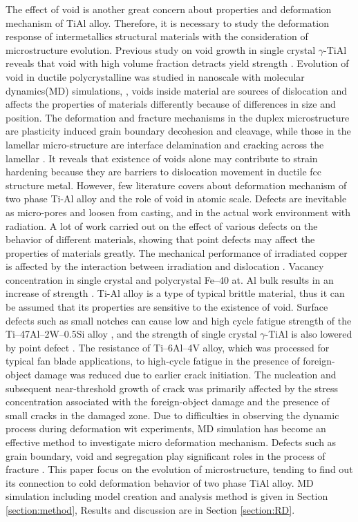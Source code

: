 \documentclass[materials,article,submit,moreauthors,pdftex,10pt,a4paper]{Definitions/mdpi}
\begin{document}
The effect of void is another great concern about properties and deformation mechanism  of TiAl alloy.  Therefore, it is necessary to study the deformation response of intermetallics structural materials with the consideration of microstructure evolution. Previous study on void growth in single crystal $\gamma$-TiAl reveals that void with high volume fraction detracts yield strength \cite{Tang2014, Xu2011}. Evolution of void in ductile polycrystalline was studied in nanoscale with molecular dynamics(MD) simulations, \cite{Jing2018a,Elkhateeb2018}, voids inside material are sources of dislocation and affects the properties of materials differently because of differences in size and position.  The deformation and fracture mechanisms in the duplex microstructure are plasticity induced grain boundary decohesion and cleavage, while those in the lamellar micro-structure are interface delamination and cracking across the lamellar \cite{Tang2014}. It reveals that existence of voids alone may contribute to strain hardening because they are barriers to dislocation movement in ductile fcc structure metal\cite{Xiong2015}. However, few literature covers about deformation mechanism of two phase Ti-Al alloy and the role of void in atomic scale. Defects are inevitable as micro-pores and loosen from casting, and in the actual work environment with radiation. A lot of work carried out on the  effect of various defects on the behavior of different materials, showing that point defects may affect the properties of materials greatly. The mechanical performance of irradiated copper is affected by the interaction between irradiation and dislocation \cite{Kiener2011}. Vacancy concentration in single crystal and polycrystal Fe–40 at. Al bulk results in an increase of strength \cite{Yang1998}. Ti-Al alloy is a type of typical brittle material, thus it can be assumed that its properties are sensitive to the existence of void. Surface defects such as small notches can cause low and high cycle fatigue strength of the Ti–47Al–2W–0.5Si alloy \cite{Nazmy2001}, and the strength of single crystal $\gamma$-TiAl is also lowered by point defect \cite{Wu2016}. The resistance of Ti–6Al–4V alloy, which was processed for typical fan blade applications, to high-cycle fatigue in the presence of foreign- object damage was reduced due to earlier crack initiation.  The nucleation and subsequent near-threshold growth of crack was primarily affected by the stress concentration associated with the foreign-object damage and the presence of small cracks in the damaged zone. Due to difficulties in observing the dynamic process during deformation wit experiments, MD simulation has become an effective method to investigate micro deformation mechanism. Defects such as grain boundary, void and segregation play significant roles in the process of fracture \cite{Larsen2016}. This paper focus on the evolution of microstructure, tending to find out its connection to cold deformation behavior of two phase TiAl alloy. MD simulation including model creation and analysis method is given in Section \ref{section:method}, Results and discussion are in Section \ref{section:RD}.
\end{document}
